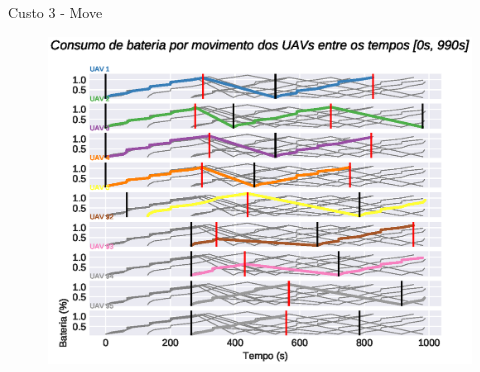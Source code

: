 \begin{frame}{Custo 3 - Move}
            \begin{figure}[!htb]
                    \includegraphics[width=\textwidth]{custo_3/uav_move_acum_all.eps}
                \end{figure}
        \end{frame}